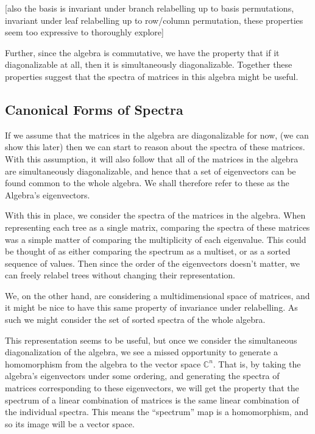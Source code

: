 \documentclass{report}
\begin{document}
[also the basis is invariant under branch relabelling up to basis permutations, invariant under leaf relabelling up to row/column permutation, these properties seem too expressive to thoroughly explore]

Further, since the algebra is commutative, we have the property that if it
diagonalizable at all, then it is simultaneously diagonalizable.
Together these properties suggest that the spectra of matrices in this algebra
might be useful.

\subsection{Canonical Forms of Spectra}

If we assume that the matrices in the algebra are diagonalizable for now, (we
can show this later) then we can start to reason about the spectra of these
matrices.
With this assumption, it will also follow that all of the matrices in the
algebra are simultaneously diagonalizable, and hence that a set of eigenvectors
can be found common to the whole algebra.
We shall therefore refer to these as the Algebra's eigenvectors.

With this in place, we consider the spectra of the matrices in the algebra.
When representing each tree as a single matrix, comparing the spectra of these
matrices was a simple matter of comparing the multiplicity of each eigenvalue.
This could be thought of as either comparing the spectrum as a multiset, or as
a sorted sequence of values.
Then since the order of the eigenvectors doesn't matter, we can freely relabel
trees without changing their representation.

We, on the other hand, are considering a multidimensional space of matrices,
and it might be nice to have this same property of invariance under
relabelling.
As such we might consider the set of sorted spectra of the whole algebra.

This representation seems to be useful, but once we consider the simultaneous
diagonalization of the algebra, we see a missed opportunity to generate a
homomorphism from the algebra to the vector space $\mathds{C}^n$.
That is, by taking the algebra's eigenvectors under some ordering, and
generating the spectra of matrices corresponding to these eigenvectors, we will
get the property that the spectrum of a linear combination of matrices is the
same linear combination of the individual spectra.
This means the ``spectrum'' map is a homomorphism, and so its image will be a
vector space.
\end{document}
